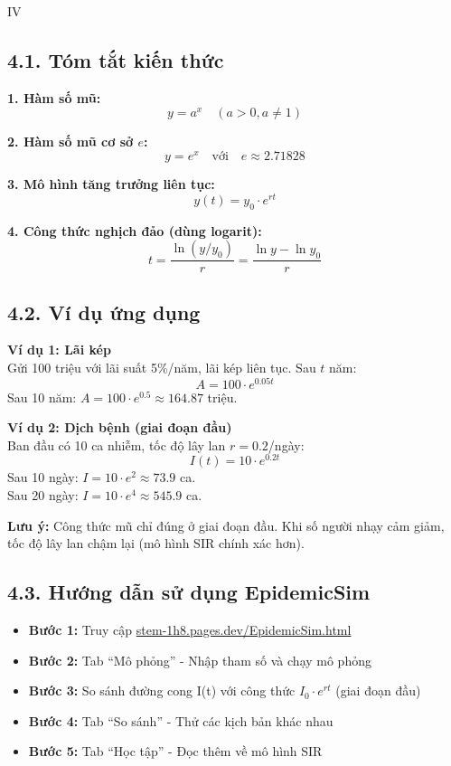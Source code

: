 \documentclass[12pt,a4paper]{article}
\begin{document}
\begin{competitionsection}{IV}
\vspace{0.5cm}
\subsection*{4.1. Tóm tắt kiến thức}

\begin{mathbox}
\textbf{1. Hàm số mũ:}
$$y = a^x \quad (a > 0, a \neq 1)$$

\textbf{2. Hàm số mũ cơ sở $e$:}
$$y = e^x \quad \text{với} \quad e \approx 2.71828$$

\textbf{3. Mô hình tăng trưởng liên tục:}
$$y(t) = y_0 \cdot e^{rt}$$

\textbf{4. Công thức nghịch đảo (dùng logarit):}
$$t = \frac{\ln(y/y_0)}{r} = \frac{\ln y - \ln y_0}{r}$$
\end{mathbox}

\subsection*{4.2. Ví dụ ứng dụng}

\textbf{Ví dụ 1: Lãi kép}\\
Gửi 100 triệu với lãi suất 5\%/năm, lãi kép liên tục. Sau $t$ năm:
$$A = 100 \cdot e^{0.05t}$$
Sau 10 năm: $A = 100 \cdot e^{0.5} \approx 164.87$ triệu.

\textbf{Ví dụ 2: Dịch bệnh (giai đoạn đầu)}\\
Ban đầu có 10 ca nhiễm, tốc độ lây lan $r = 0.2$/ngày:
$$I(t) = 10 \cdot e^{0.2t}$$
Sau 10 ngày: $I = 10 \cdot e^{2} \approx 73.9$ ca.\\
Sau 20 ngày: $I = 10 \cdot e^{4} \approx 545.9$ ca.

\textbf{Lưu ý:} Công thức mũ chỉ đúng ở giai đoạn đầu. Khi số người nhạy cảm giảm, tốc độ lây lan chậm lại (mô hình SIR chính xác hơn).

\subsection*{4.3. Hướng dẫn sử dụng EpidemicSim}
\begin{itemize}[leftmargin=*,noitemsep]
\item \textbf{Bước 1:} Truy cập \href{https://stem-1h8.pages.dev/EpidemicSim.html}{stem-1h8.pages.dev/EpidemicSim.html}
\item \textbf{Bước 2:} Tab ``Mô phỏng'' - Nhập tham số và chạy mô phỏng
\item \textbf{Bước 3:} So sánh đường cong I(t) với công thức $I_0 \cdot e^{rt}$ (giai đoạn đầu)
\item \textbf{Bước 4:} Tab ``So sánh'' - Thử các kịch bản khác nhau
\item \textbf{Bước 5:} Tab ``Học tập'' - Đọc thêm về mô hình SIR
\end{itemize}
\end{competitionsection}
\newpage
\end{document}
